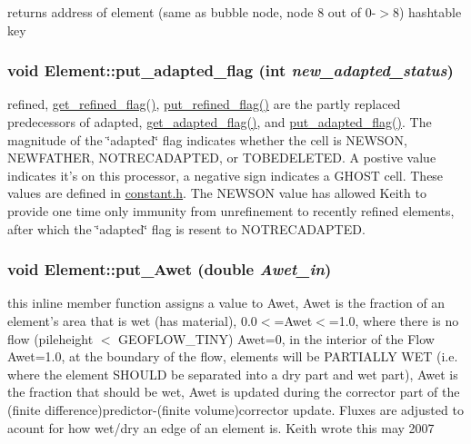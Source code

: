 returns address of element (same as bubble node, node 8 out of 0-$>$8) hashtable key 

\hypertarget{classElement_a37}{
\subsubsection[put\_\-adapted\_\-flag]{\setlength{\rightskip}{0pt plus 5cm}void Element::put\_\-adapted\_\-flag (int {\em new\_\-adapted\_\-status})}}
\label{classElement_a37}


refined, \hyperlink{classElement_a33}{get\_\-refined\_\-flag()}, \hyperlink{classElement_a36}{put\_\-refined\_\-flag()} are the partly replaced predecessors of adapted, \hyperlink{classElement_a34}{get\_\-adapted\_\-flag()}, and \hyperlink{classElement_a37}{put\_\-adapted\_\-flag()}. The magnitude of the \char`\"{}adapted\char`\"{} flag indicates whether the cell is NEWSON, NEWFATHER, NOTRECADAPTED, or TOBEDELETED. A postive value indicates it's on this processor, a negative sign indicates a GHOST cell. These values are defined in \hyperlink{constant_8h}{constant.h}. The NEWSON value has allowed Keith to provide one time only immunity from unrefinement to recently refined elements, after which the \char`\"{}adapted\char`\"{} flag is resent to NOTRECADAPTED. 

\hypertarget{classElement_a122}{
\subsubsection[put\_\-Awet]{\setlength{\rightskip}{0pt plus 5cm}void Element::put\_\-Awet (double {\em Awet\_\-in})}}
\label{classElement_a122}


this inline member function assigns a value to Awet, Awet is the fraction of an element's area that is wet (has material), 0.0$<$=Awet$<$=1.0, where there is no flow (pileheight $<$ GEOFLOW\_\-TINY) Awet=0, in the interior of the Flow Awet=1.0, at the boundary of the flow, elements will be PARTIALLY WET (i.e. where the element SHOULD be separated into a dry part and wet part), Awet is the fraction that should be wet, Awet is updated during the corrector part of the (finite difference)predictor-(finite volume)corrector update. Fluxes are adjusted to acount for how wet/dry an edge of an element is. Keith wrote this may 2007 

